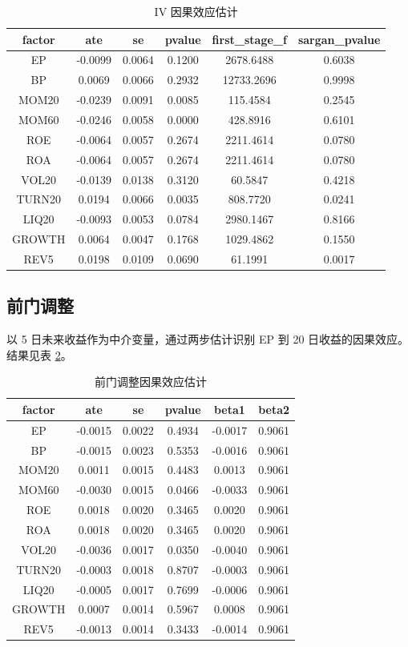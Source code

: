 \documentclass[12pt,a4paper]{ctexart}
\begin{document}
\begin{table}[htbp]
\centering
\caption{IV 因果效应估计}
\label{tab:iv}
\begin{tabular}{cccccc}
\toprule
factor & ate & se & pvalue & first\_stage\_f & sargan\_pvalue \\ 
\midrule
EP & -0.0099 & 0.0064 & 0.1200 & 2678.6488 & 0.6038 \\ 
BP & 0.0069 & 0.0066 & 0.2932 & 12733.2696 & 0.9998 \\ 
MOM20 & -0.0239 & 0.0091 & 0.0085 & 115.4584 & 0.2545 \\ 
MOM60 & -0.0246 & 0.0058 & 0.0000 & 428.8916 & 0.6101 \\ 
ROE & -0.0064 & 0.0057 & 0.2674 & 2211.4614 & 0.0780 \\ 
ROA & -0.0064 & 0.0057 & 0.2674 & 2211.4614 & 0.0780 \\ 
VOL20 & -0.0139 & 0.0138 & 0.3120 & 60.5847 & 0.4218 \\ 
TURN20 & 0.0194 & 0.0066 & 0.0035 & 808.7720 & 0.0241 \\ 
LIQ20 & -0.0093 & 0.0053 & 0.0784 & 2980.1467 & 0.8166 \\ 
GROWTH & 0.0064 & 0.0047 & 0.1768 & 1029.4862 & 0.1550 \\ 
REV5 & 0.0198 & 0.0109 & 0.0690 & 61.1991 & 0.0017 \\ 
\bottomrule
\end{tabular}
\end{table}

\subsection{前门调整}
以 5 日未来收益作为中介变量，通过两步估计识别 EP 到 20 日收益的因果效应。结果见表 \ref{tab:fd}。

\begin{table}[htbp]
\centering
\caption{前门调整因果效应估计}
\label{tab:fd}
\begin{tabular}{cccccc}
\toprule
factor & ate & se & pvalue & beta1 & beta2 \\ 
\midrule
EP & -0.0015 & 0.0022 & 0.4934 & -0.0017 & 0.9061 \\ 
BP & -0.0015 & 0.0023 & 0.5353 & -0.0016 & 0.9061 \\ 
MOM20 & 0.0011 & 0.0015 & 0.4483 & 0.0013 & 0.9061 \\ 
MOM60 & -0.0030 & 0.0015 & 0.0466 & -0.0033 & 0.9061 \\ 
ROE & 0.0018 & 0.0020 & 0.3465 & 0.0020 & 0.9061 \\ 
ROA & 0.0018 & 0.0020 & 0.3465 & 0.0020 & 0.9061 \\ 
VOL20 & -0.0036 & 0.0017 & 0.0350 & -0.0040 & 0.9061 \\ 
TURN20 & -0.0003 & 0.0018 & 0.8707 & -0.0003 & 0.9061 \\ 
LIQ20 & -0.0005 & 0.0017 & 0.7699 & -0.0006 & 0.9061 \\ 
GROWTH & 0.0007 & 0.0014 & 0.5967 & 0.0008 & 0.9061 \\ 
REV5 & -0.0013 & 0.0014 & 0.3433 & -0.0014 & 0.9061 \\ 
\bottomrule
\end{tabular}
\end{table}
\end{document}
